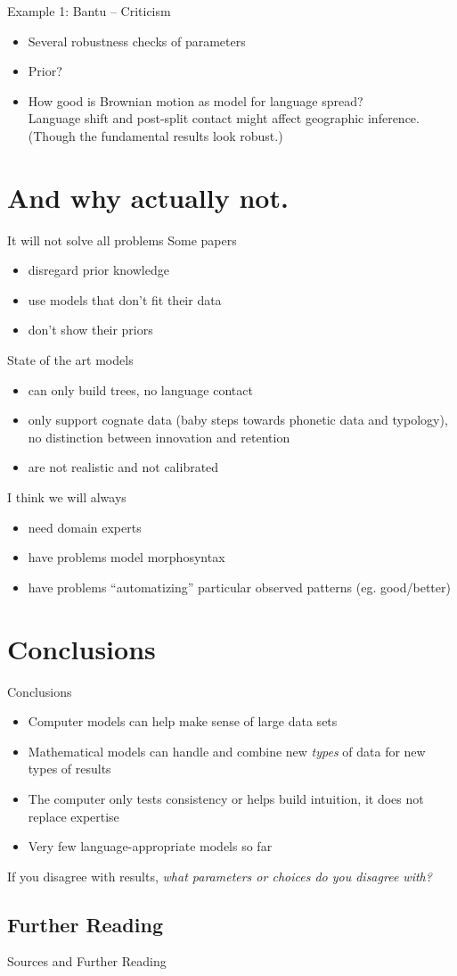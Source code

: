 \documentclass[9pt]{beamer}
\begin{document}
\begin{frame}{Example 1: Bantu – Criticism}
  \begin{itemize}
  \item Several robustness checks of parameters
  \item Prior?
  \item How good is Brownian motion as model for language spread?\\
    Language shift and post-split contact might affect geographic
    inference. (Though the fundamental results look robust.)
  \end{itemize}
\end{frame}
\section{And why actually not.}
\begin{frame}{It will not solve all problems}
  Some papers
  \begin{itemize}
  \item disregard prior knowledge
  \item use models that don't fit their data
  \item don't show their priors
  \end{itemize}
  \pause
  State of the art models
  \begin{itemize}
  \item can only build trees, no language contact
    \pause
  \item only support cognate data (baby steps towards phonetic data and typology),
    \pause no distinction between innovation and retention
    \pause 
  \item are not realistic and not calibrated
  \end{itemize}
  \pause
  I think we will always
  \begin{itemize}
  \item need domain experts
  \item have problems model morphosyntax
  \item have problems “automatizing” particular observed patterns (eg. good/better)
  \end{itemize}
\end{frame}
\section{Conclusions}
\begin{frame}{Conclusions}
  \begin{itemize}
  \item Computer models can help make sense of large data sets
  \item Mathematical models can handle and combine new \emph{types} of data for new types of results
  \item The computer only tests consistency or helps build intuition, it does not replace expertise
  \item Very few language-appropriate models so far
  \end{itemize}
  If you disagree with results, \emph{what parameters or choices do you disagree with?}
\end{frame}
\subsection{Further Reading}
\begin{frame}[t,allowframebreaks]{Sources and Further Reading}
  \nocite{mcmahon,grayatkinson}
  \printbibliography
\end{frame}
\end{document}
